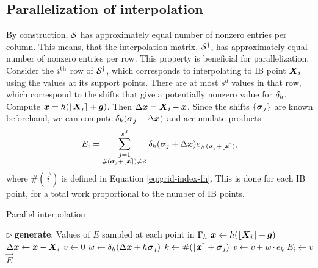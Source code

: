 \subsection{Parallelization of interpolation}

By construction, $\mathcal{S}$ has approximately equal number of nonzero entries per column.
This means, that the interpolation matrix, $\mathcal{S}^\dagger$, has approximately equal number of
nonzero entries per row. This property is beneficial for parallelization. Consider the
$i\textsuperscript{th}$ row of $\mathcal{S}^\dagger$, which corresponds to interpolating to IB point $\boldsymbol{X}_i$ using the
values at its support points. There are at most $s^d$ values in that row, which
correspond to the shifts that give a potentially nonzero value for $\delta_h$. Compute
$\boldsymbol{x}=h(\left\lfloor{\boldsymbol{X}_i}\right\rceil+\boldsymbol{g})$. Then $\Delta\boldsymbol{x}=\boldsymbol{X}_i-\boldsymbol{x}$. Since the shifts $\{\boldsymbol{\sigma}_j\}$ are
known beforehand, we can compute $\delta_h(\boldsymbol{\sigma}_j-\Delta\boldsymbol{x})$ and accumulate products
\begin{equation*}
    E_i = \sum_{\substack{j=1\\\#(\boldsymbol{\sigma}_j+\left\lfloor{\boldsymbol{x}}\right\rceil)\neq\varnothing}}^{s^d}\delta_h(\boldsymbol{\sigma}_j+\Delta\boldsymbol{x})e_{\#(\boldsymbol{\sigma}_j+\left\lfloor{\boldsymbol{x}}\right\rceil)},
\end{equation*}
where $\#(\vec{i})$ is defined in Equation \ref{eq:grid-index-fn}. This is done for each
IB point, for a total work proportional to the number of IB points.

\begin{algorithm}
\caption{Parallel interpolation}
\label{algo:par-interp}
\begin{algorithmic}[1]
\State $\triangleright\ $\textbf{generate}: Values of $E$ sampled at each point in $\Gamma_h$
    \State $\boldsymbol{x} \gets h(\left\lfloor{\boldsymbol{X}_i}\right\rceil+\boldsymbol{g})$
    \State $\Delta\boldsymbol{x} \gets \boldsymbol{x}-\boldsymbol{X}_i$
    \State $v \gets 0$
        \State $w \gets \delta_h(\Delta\boldsymbol{x}+h\boldsymbol{\sigma}_j)$
        \State $k \gets \#(\left\lfloor{\boldsymbol{x}}\right\rceil+\boldsymbol{\sigma}_j)$
            \State $v \gets v + w \cdot e_k$\label{line:par-interp-acc}
        \EndIf
    \EndFor
    \State $E_i \gets v$\label{line:par-interp-write}
\EndFor
\State \Return $\vec{E}$
\EndProcedure
\end{algorithmic}
\end{algorithm}

